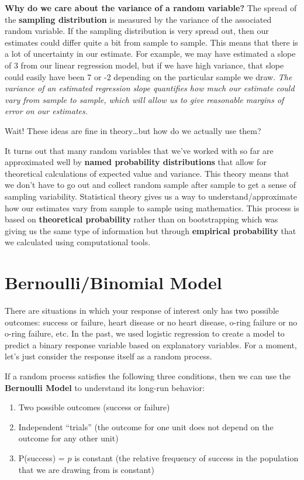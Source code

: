\documentclass[]{book}
\providecommand{\tightlist}{%
  \setlength{\itemsep}{0pt}\setlength{\parskip}{0pt}}
\begin{document}
\textbf{Why do we care about the variance of a random variable?} The spread of the \textbf{sampling distribution} is measured by the variance of the associated random variable. If the sampling distribution is very spread out, then our estimates could differ quite a bit from sample to sample. This means that there is a lot of uncertainty in our estimate. For example, we may have estimated a slope of 3 from our linear regression model, but if we have high variance, that slope could easily have been 7 or -2 depending on the particular sample we draw. \emph{The variance of an estimated regression slope quantifies how much our estimate could vary from sample to sample, which will allow us to give reasonable margins of error on our estimates.}

Wait! These ideas are fine in theory\ldots{}but how do we actually use them?

It turns out that many random variables that we've worked with so far are approximated well by \textbf{named probability distributions} that allow for theoretical calculations of expected value and variance. This theory means that we don't have to go out and collect random sample after sample to get a sense of sampling variability. Statistical theory gives us a way to understand/approximate how our estimates vary from sample to sample using mathematics. This process is based on \textbf{theoretical probability} rather than on bootstrapping which was giving us the same type of information but through \textbf{empirical probability} that we calculated using computational tools.

\hypertarget{bernoullibinomial-model}{%
\section{Bernoulli/Binomial Model}\label{bernoullibinomial-model}}

There are situations in which your response of interest only has two possible outcomes: success or failure, heart disease or no heart disease, o-ring failure or no o-ring failure, etc. In the past, we used logistic regression to create a model to predict a binary response variable based on explanatory variables. For a moment, let's just consider the response itself as a random process.

If a random process satisfies the following three conditions, then we can use the \textbf{Bernoulli Model} to understand its long-run behavior:

\begin{enumerate}
\def\labelenumi{\arabic{enumi}.}
\tightlist
\item
  Two possible outcomes (success or failure)
\item
  Independent ``trials'' (the outcome for one unit does not depend on the outcome for any other unit)
\item
  P(success) = \(p\) is constant (the relative frequency of success in the population that we are drawing from is constant)
\end{enumerate}
\end{document}
